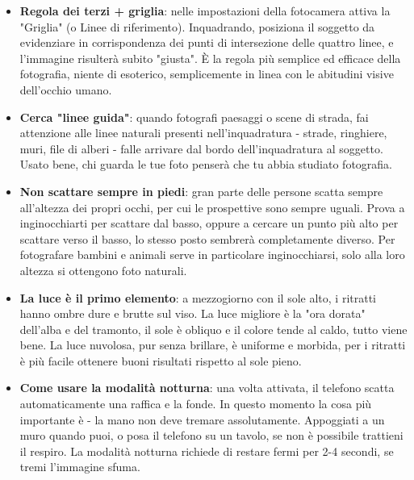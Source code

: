 \begin{itemize}
  \item \textbf{Regola dei terzi + griglia}: nelle impostazioni della fotocamera attiva la "Griglia" (o Linee di riferimento). Inquadrando, posiziona il soggetto da evidenziare in corrispondenza dei punti di intersezione delle quattro linee, e l'immagine risulterà subito "giusta". È la regola più semplice ed efficace della fotografia, niente di esoterico, semplicemente in linea con le abitudini visive dell'occhio umano.
  \item \textbf{Cerca "linee guida"}: quando fotografi paesaggi o scene di strada, fai attenzione alle linee naturali presenti nell'inquadratura - strade, ringhiere, muri, file di alberi - falle arrivare dal bordo dell'inquadratura al soggetto. Usato bene, chi guarda le tue foto penserà che tu abbia studiato fotografia.
  \item \textbf{Non scattare sempre in piedi}: gran parte delle persone scatta sempre all'altezza dei propri occhi, per cui le prospettive sono sempre uguali. Prova a inginocchiarti per scattare dal basso, oppure a cercare un punto più alto per scattare verso il basso, lo stesso posto sembrerà completamente diverso. Per fotografare bambini e animali serve in particolare inginocchiarsi, solo alla loro altezza si ottengono foto naturali.
  \item \textbf{La luce è il primo elemento}: a mezzogiorno con il sole alto, i ritratti hanno ombre dure e brutte sul viso. La luce migliore è la "ora dorata" dell'alba e del tramonto, il sole è obliquo e il colore tende al caldo, tutto viene bene. La luce nuvolosa, pur senza brillare, è uniforme e morbida, per i ritratti è più facile ottenere buoni risultati rispetto al sole pieno.
  \item \textbf{Come usare la modalità notturna}: una volta attivata, il telefono scatta automaticamente una raffica e la fonde. In questo momento la cosa più importante è - la mano non deve tremare assolutamente. Appoggiati a un muro quando puoi, o posa il telefono su un tavolo, se non è possibile trattieni il respiro. La modalità notturna richiede di restare fermi per 2-4 secondi, se tremi l'immagine sfuma.
\end{itemize}


